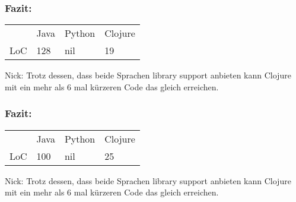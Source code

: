 \documentclass[compress, blue]{beamer}
\begin{document}





\begin{frame}\frametitle{Fazit:}
    \begin{tabular}{l | l l l}
     & Java &  Python & Clojure  \\
    LoC & 128 &  nil & 19  \\
  \end{tabular}
  
  \begin{block}{Nick:}
    Trotz dessen, dass beide Sprachen library support anbieten kann
    Clojure mit ein mehr als 6 mal kürzeren Code das gleich erreichen.
  \end{block}
\end{frame}






\begin{frame}\frametitle{Fazit:}
    \begin{tabular}{l | l l l}
     & Java &  Python & Clojure  \\
    LoC & 100 &  nil & 25  \\
  \end{tabular}
  
  \begin{block}{Nick:}
    Trotz dessen, dass beide Sprachen library support anbieten kann
    Clojure mit ein mehr als 6 mal kürzeren Code das gleich erreichen.
  \end{block}
\end{frame}
\end{document}

